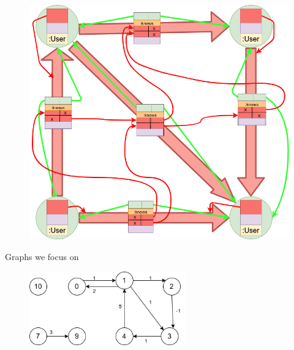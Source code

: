 \documentclass[rgb]{beamer}
\begin{document}
            \begin{frame}
            \vspace{-3.5em}
            \begin{figure}
                \begin{center}
                \includegraphics[keepaspectratio, height=1.2\textheight, width=\textwidth]{img/example_structs.png}
                \end{center}
            \end{figure}
        \end{frame}
        
        \begin{frame}{Graphs we focus on}
            \begin{figure}
                \begin{center}
                \includegraphics[keepaspectratio, height=0.8\textheight, width=0.6\textwidth]{img/data_struct_gr.png}
                \end{center}
            \end{figure}
        \end{frame}
    
\end{document}
